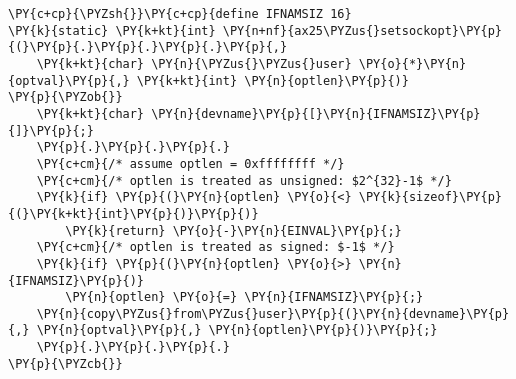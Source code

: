 \begin{Verbatim}[commandchars=\\\{\},codes={\catcode`\$=3\catcode`\^=7\catcode`\_=8}]
\PY{c+cp}{\PYZsh{}}\PY{c+cp}{define IFNAMSIZ 16}
\PY{k}{static} \PY{k+kt}{int} \PY{n+nf}{ax25\PYZus{}setsockopt}\PY{p}{(}\PY{p}{.}\PY{p}{.}\PY{p}{.}\PY{p}{,}
    \PY{k+kt}{char} \PY{n}{\PYZus{}\PYZus{}user} \PY{o}{*}\PY{n}{optval}\PY{p}{,} \PY{k+kt}{int} \PY{n}{optlen}\PY{p}{)}
\PY{p}{\PYZob{}}
    \PY{k+kt}{char} \PY{n}{devname}\PY{p}{[}\PY{n}{IFNAMSIZ}\PY{p}{]}\PY{p}{;}
    \PY{p}{.}\PY{p}{.}\PY{p}{.}
    \PY{c+cm}{/* assume optlen = 0xffffffff */}
    \PY{c+cm}{/* optlen is treated as unsigned: $2^{32}-1$ */}
    \PY{k}{if} \PY{p}{(}\PY{n}{optlen} \PY{o}{<} \PY{k}{sizeof}\PY{p}{(}\PY{k+kt}{int}\PY{p}{)}\PY{p}{)}
        \PY{k}{return} \PY{o}{-}\PY{n}{EINVAL}\PY{p}{;}
    \PY{c+cm}{/* optlen is treated as signed: $-1$ */}
    \PY{k}{if} \PY{p}{(}\PY{n}{optlen} \PY{o}{>} \PY{n}{IFNAMSIZ}\PY{p}{)}
        \PY{n}{optlen} \PY{o}{=} \PY{n}{IFNAMSIZ}\PY{p}{;}
    \PY{n}{copy\PYZus{}from\PYZus{}user}\PY{p}{(}\PY{n}{devname}\PY{p}{,} \PY{n}{optval}\PY{p}{,} \PY{n}{optlen}\PY{p}{)}\PY{p}{;}
    \PY{p}{.}\PY{p}{.}\PY{p}{.}
\PY{p}{\PYZcb{}}
\end{Verbatim}
